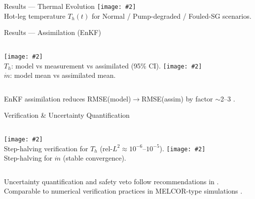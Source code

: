 \documentclass[aspectratio=169]{beamer}
\newcommand{\img}[2][]{\texttt{[image: \#2]}}
\begin{document}
\begin{frame}{Results — Thermal Evolution}
\centering
\img[0.9]{assets/fig_temperature_dynamic.png}\\[-0.2em]
\footnotesize Hot-leg temperature $T_h(t)$ for Normal / Pump-degraded / Fouled-SG scenarios.
\end{frame}

\begin{frame}{Results — Assimilation (EnKF)}
\begin{columns}[T,onlytextwidth]
\img[0.98]{assets/fig_enkf_dynamic_Normal_Th.png}\\[-0.2em]
\footnotesize $T_h$: model vs measurement vs assimilated (95\% CI).
\img[0.98]{assets/fig_enkf_dynamic_Normal_mdot.png}\\[-0.2em]
\footnotesize $\dot m$: model mean vs assimilated mean.
\end{columns}
\medskip
\footnotesize
EnKF assimilation reduces RMSE(model)$\rightarrow$RMSE(assim) by factor $\sim$2--3 \cite{evensen_ensemble_2003}.
\end{frame}

\begin{frame}{Verification \& Uncertainty Quantification}
\begin{columns}[T,onlytextwidth]
\img[0.98]{assets/fig_verification_dynamic_Th.png}\\[-0.2em]
\footnotesize Step-halving verification for $T_h$ (rel-$L^2 \approx 10^{-6}$–$10^{-5}$).
\img[0.98]{assets/fig_verification_dynamic_mdot.png}\\[-0.2em]
\footnotesize Step-halving for $\dot m$ (stable convergence).
\end{columns}
\medskip
\footnotesize
Uncertainty quantification and safety veto follow recommendations in \cite{kochunas_digital_2021}.\\
Comparable to numerical verification practices in MELCOR-type simulations \cite{noauthor_pdf_2025}.
\end{frame}
\end{document}
